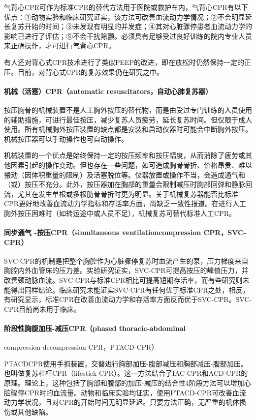 气背心CPR可作为标准CPR的替代方法用于医院或救护车内，气背心CPR有以下优点：①动物实验和临床研究证实，该方法可改善血流动力学情况；②不会明显延长复苏开始的时间；③未发现有明显的并发症；④其对心脏骤停患者血流动力学的影响已进行了评估；⑤不会干扰除颤。必须具有足够受过良好训练的院内专业人员来正确操作，才可进行气背心CPR。

有人还对背心式CPR技术进行了类似PEEP的改进，即在放松时仍然保持一定的正压。目前，对背心式CPR的复苏效果仍在研究之中。

\paragraph{机械（活塞）CPR（automatic resuscitators，自动心肺复苏器）}

按压胸骨的机械装置不是人工胸外按压的替代物，而是由受过专门训练的人员使用的辅助措施，可进行最佳按压，减少复苏人员疲劳，延长复苏时间。但仅限于成人使用。所有机械胸外按压装置的缺点都是安装和启动仪器时可能会中断胸外按压。机械按压器可以手动操作也可自动操作。

机械装置的一个优点是始终保持一定的按压频率和按压幅度，从而消除了疲劳或其他因素引起的操作变动。但也存在一些问题，如可造成胸骨骨折、价格昂贵、难以搬动（因体积重量的限制）及活塞脱位等。仪器放置或操作不当，会造成通气和（或）按压不充分。此外，按压器加在胸部的重量会限制减压时胸部回弹和静脉回流，尤其在发生单根或多根肋骨骨折时更为明显。关于机械复苏器能否比标准CPR更好地改善血流动力学指标和存活率方面，尚缺乏一致性报道。在进行人工胸外按压困难时（如转运途中或人员不足），机械复苏可替代标准人工CPR。

\paragraph{同步通气 -按压CPR（simultaneous ventilationcompression CPR，SVC-CPR）}

SVC-CPR的机制是把整个胸腔作为心脏骤停复苏时血流产生的泵，压力梯度来自胸腔内外血管床的压力差。实验研究证实，SVC-CPR可提高按压的峰值压力，并改善颈动脉血流。SVC-CPR与标准CPR相比可提高短期存活率，而有些研究则未能得出同样结论。临床研究未能证实SVC-CPR有任何优于标准CPR之处，相反，有研究显示，标准CPR在改善血流动力学和存活率方面反而优于SVC-CPR。SVC-CPR目前尚未用于临床。

\paragraph{阶段性胸腹加压-减压CPR（phased thoracic-abdominal}
compression-decompression CPR，PTACD-CPR）

PTACDCPR使用手抓装置，交替进行胸部加压-腹部减压和胸部减压-腹部加压。也叫做复苏杠杆CPR（lifestick
CPR）。这一方法结合了IAC-CPR和ACD-CPR的原理。理论上，这种包括了胸部和腹部的加压-减压的结合性4阶段方法可以增加心脏骤停CPR时的血流量。动物和临床实验均证实，使用PTACD-CPR可改善血流动力学状况，且对CPR的开始时间无明显延迟。只要方法正确，无严重的机体损伤或其他缺陷。

